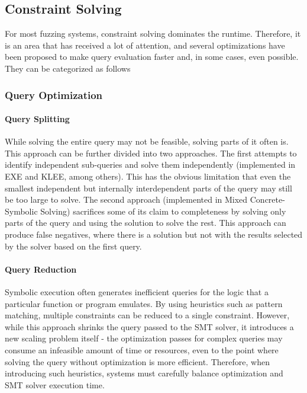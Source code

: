\documentclass{article}
\begin{document}
\begin{multicols}{2}
    \subsection{Constraint Solving}
    \label{ConstraintSolving}
    For most fuzzing systems, constraint solving dominates the runtime. Therefore, it is an area that has received a lot of attention, and several optimizations have been proposed to make query evaluation faster and, in some cases, even possible. They can be categorized as follows

    \subsubsection{Query Optimization}
    \paragraph{Query Splitting} While solving the entire query may not be feasible, solving parts of it often is. This approach can be further divided into two approaches. The first attempts to identify independent sub-queries and solve them independently (implemented in EXE\cite{EXE} and KLEE\cite{KLEE}, among others). This has the obvious limitation that even the smallest independent but internally interdependent parts of the query may still be too large to solve. The second approach (implemented in Mixed Concrete-Symbolic Solving\cite{MCSS}) sacrifices some of its claim to completeness by solving only parts of the query and using the solution to solve the rest. This approach can produce false negatives, where there is a solution but not with the results selected by the solver based on the first query.

    \paragraph{Query Reduction} Symbolic execution often generates inefficient queries for the logic that a particular function or program emulates. By using heuristics such as pattern matching, multiple constraints can be reduced to a single constraint. However, while this approach shrinks the query passed to the SMT solver, it introduces a new scaling problem itself - the optimization passes for complex queries may consume an infeasible amount of time or resources, even to the point where solving the query without optimization is more efficient. Therefore, when introducing such heuristics, systems must carefully balance optimization and SMT solver execution time.


\end{multicols}
\end{document}
